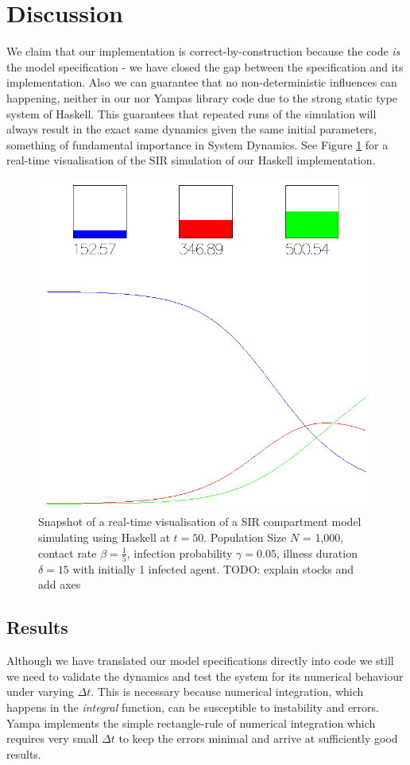 \section{Discussion}
We claim that our implementation is correct-by-construction because the code \textit{is} the model specification - we have closed the gap between the specification and its implementation. Also we can guarantee that no non-deterministic influences can happening, neither in our nor Yampas library code due to the strong static type system of Haskell. This guarantees that repeated runs of the simulation will always result in the exact same dynamics given the same initial parameters, something of fundamental importance in System Dynamics. See Figure \ref{fig:sir_sd_visualisation} for a real-time visualisation of the SIR simulation of our Haskell implementation.

\begin{figure}
	\centering
	\includegraphics[width=.4\textwidth, angle=0]{./fig/visualisation_t50.png}
	\caption{Snapshot of a real-time visualisation of a SIR compartment model simulating using Haskell at $t = 50$. Population Size $N$ = 1,000, contact rate $\beta = \frac{1}{5}$, infection probability $\gamma = 0.05$, illness duration $\delta = 15$ with initially 1 infected agent. TODO: explain stocks and add axes}
	\label{fig:sir_sd_visualisation}
\end{figure}

\subsection{Results}
Although we have translated our model specifications directly into code we still we need to validate the dynamics and test the system for its numerical behaviour under varying $\Delta t$. This is necessary because numerical integration, which happens in the \textit{integral} function, can be susceptible to instability and errors. Yampa implements the simple rectangle-rule of numerical integration which requires very small $\Delta t$ to keep the errors minimal and arrive at sufficiently good results. 

